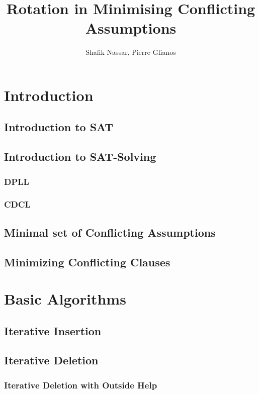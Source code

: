 \documentclass[]{article}
\title{Rotation in Minimising Conflicting Assumptions}
\author{Shafik Nassar, Pierre Glianos}
\begin{document}
\maketitle

\begin{abstract}

\end{abstract}

\tableofcontents

\section{Introduction}
\subsection{Introduction to SAT}
\subsection{Introduction to SAT-Solving}
\subsubsection{DPLL}
\subsubsection{CDCL}
\subsection{Minimal set of Conflicting Assumptions}
\subsection[Similar Problem]{Minimizing Conflicting Clauses}

\section{Basic Algorithms}
\subsection{Iterative Insertion}
\subsection{Iterative Deletion}
\subsubsection{Iterative Deletion with Outside Help}
\end{document}
